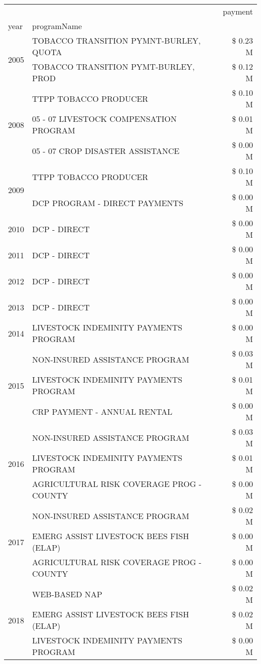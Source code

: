 \begin{tabular}{llr}
\toprule
 &  & payment \\
year & programName &  \\
\midrule
\multirow[t]{2}{*}{2005} & TOBACCO TRANSITION PYMNT-BURLEY, QUOTA & \$ 0.23 M \\
 & TOBACCO TRANSITION PYMT-BURLEY, PROD & \$ 0.12 M \\
\cline{1-3}
\multirow[t]{3}{*}{2008} & TTPP TOBACCO PRODUCER & \$ 0.10 M \\
 & 05 - 07 LIVESTOCK COMPENSATION PROGRAM & \$ 0.01 M \\
 & 05 - 07 CROP DISASTER ASSISTANCE & \$ 0.00 M \\
\cline{1-3}
\multirow[t]{2}{*}{2009} & TTPP TOBACCO PRODUCER & \$ 0.10 M \\
 & DCP PROGRAM - DIRECT PAYMENTS & \$ 0.00 M \\
\cline{1-3}
2010 & DCP - DIRECT & \$ 0.00 M \\
\cline{1-3}
2011 & DCP - DIRECT & \$ 0.00 M \\
\cline{1-3}
2012 & DCP - DIRECT & \$ 0.00 M \\
\cline{1-3}
2013 & DCP - DIRECT & \$ 0.00 M \\
\cline{1-3}
2014 & LIVESTOCK INDEMINITY PAYMENTS PROGRAM & \$ 0.00 M \\
\cline{1-3}
\multirow[t]{3}{*}{2015} & NON-INSURED ASSISTANCE PROGRAM & \$ 0.03 M \\
 & LIVESTOCK INDEMINITY PAYMENTS PROGRAM & \$ 0.01 M \\
 & CRP PAYMENT - ANNUAL RENTAL & \$ 0.00 M \\
\cline{1-3}
\multirow[t]{3}{*}{2016} & NON-INSURED ASSISTANCE PROGRAM & \$ 0.03 M \\
 & LIVESTOCK INDEMINITY PAYMENTS PROGRAM & \$ 0.01 M \\
 & AGRICULTURAL RISK COVERAGE PROG - COUNTY & \$ 0.00 M \\
\cline{1-3}
\multirow[t]{3}{*}{2017} & NON-INSURED ASSISTANCE PROGRAM & \$ 0.02 M \\
 & EMERG ASSIST LIVESTOCK BEES FISH (ELAP) & \$ 0.00 M \\
 & AGRICULTURAL RISK COVERAGE PROG - COUNTY & \$ 0.00 M \\
\cline{1-3}
\multirow[t]{3}{*}{2018} & WEB-BASED NAP & \$ 0.02 M \\
 & EMERG ASSIST LIVESTOCK BEES FISH (ELAP) & \$ 0.02 M \\
 & LIVESTOCK INDEMINITY PAYMENTS PROGRAM & \$ 0.00 M \\

\end{tabular}
